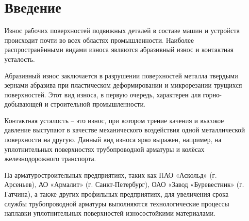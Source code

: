 \chapter{Введение}
Износ рабочих поверхностей подвижных деталей в составе машин и устройств происходит почти во всех областях промышленности.
Наиболее распространёнными видами износа являются абразивный износ и контактная усталость.

Абразивный износ заключается в разрушении поверхностей металла твердыми зернами абразива при пластическом деформировании и микрорезании трущихся поверхностей.
Этот вид износа, в первую очередь, характерен для горно-добывающей и строительной промышленности.

Контактная усталость – это износ, при котором трение качения и высокое давление выступают в качестве механического воздействия одной металлической поверхности на другую.
Данный вид износа ярко выражен, например, на уплотнительных поверхностях трубопроводной арматуры и колёсах железнодорожного транспорта.
%

На арматуростроительных предприятиях, таких как ПАО «Аскольд» (г. Арсеньев), АО «Армалит» (г. Санкт-Петербург), ОАО «Завод «Буревестник» (г. Гатчина), а также других профильных предприятиях, для увеличения срока службы трубопроводной арматуры выполняются технологические процессы наплавки уплотнительных поверхностей износостойкими материалами.
